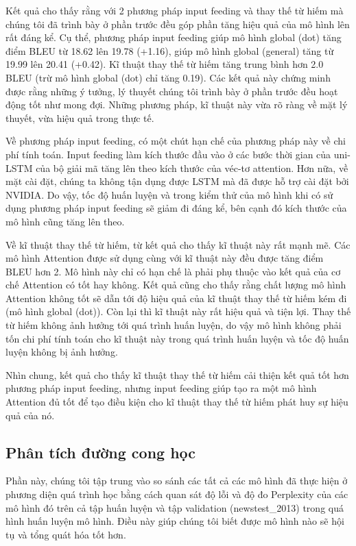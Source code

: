 Kết quả cho thấy rằng với 2 phương pháp input feeding và thay thế từ hiếm mà chúng tôi đã trình bày ở phần trước đều góp phần tăng hiệu quả của mô hình lên rất đáng kể. Cụ thể, phương pháp input feeding giúp mô hình global (dot) tăng điểm BLEU từ 18.62 lên 19.78 (+1.16), giúp mô hình global (general) tăng từ 19.99 lên 20.41 (+0.42). Kĩ thuật thay thế từ hiếm tăng trung bình hơn 2.0 BLEU (trừ mô hình global (dot) chỉ tăng 0.19). Các kết quả này chứng minh được rằng những ý tưởng, lý thuyết chúng tôi trình bày ở phần trước đều hoạt động tốt như mong đợi. Những phương pháp, kĩ thuật này vừa rõ ràng về mặt lý thuyết, vừa hiệu quả trong thực tế.

Về phương pháp input feeding, có một chút hạn chế của phương pháp này về chi phí tính toán. Input feeding làm kích thước đầu vào ở các bước thời gian của uni-LSTM của bộ giải mã tăng lên theo kích thước của véc-tơ attention. Hơn nữa, về mặt cài đặt, chúng ta không tận dụng được LSTM mà đã được hỗ trợ cài đặt bởi NVIDIA. Do vậy, tốc độ huấn luyện và trong kiểm thử của mô hình khi có sử dụng phương pháp input feeding sẽ giảm đi đáng kể, bên cạnh đó kích thước của mô hình cũng tăng lên theo.

Về kĩ thuật thay thế từ hiếm, từ kết quả cho thấy kĩ thuật này rất mạnh mẽ. Các mô hình Attention được sử dụng cùng với kĩ thuật này đều được tăng điểm BLEU hơn 2. Mô hình này chỉ có hạn chế là phải phụ thuộc vào kết quả của cơ chế Attention có tốt hay không. Kết quả cũng cho thấy rằng chất lượng mô hình Attention không tốt sẽ dẫn tới độ hiệu quả của kĩ thuật thay thế từ hiếm kém đi (mô hình global (dot)). Còn lại thì kĩ thuật này rất hiệu quả và tiện lợi. Thay thế từ hiếm không ảnh hưởng tới quá trình huấn luyện, do vậy mô hình không phải tốn chi phí tính toán cho kĩ thuật này trong quá trình huấn luyện và tốc độ huấn luyện không bị ảnh hưởng. 

Nhìn chung, kết quả cho thấy kĩ thuật thay thế từ hiếm cải thiện kết quả tốt hơn phương pháp input feeding, nhưng input feeding giúp tạo ra một mô hình Attention đủ tốt để tạo điều kiện cho kĩ thuật thay thế từ hiếm phát huy sự hiệu quả của nó.

\subsection{Phân tích đường cong học}
Phần này, chúng tôi tập trung vào so sánh các tất cả các mô hình đã thực hiện ở phương diện quá trình học bằng cách quan sát độ lỗi và độ đo Perplexity của các mô hình đó trên cả tập huấn luyện và tập validation (newstest\_2013) trong quá hình huấn luyện mô hình. Điều này giúp chúng tôi biết được mô hình nào sẽ hội tụ và tổng quát hóa tốt hơn.

